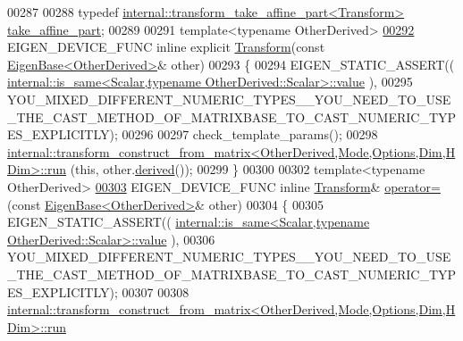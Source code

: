 \begin{DoxyCode}
00287 
00288   \textcolor{keyword}{typedef} \hyperlink{struct_eigen_1_1internal_1_1transform__take__affine__part}{internal::transform\_take\_affine\_part<Transform>} 
      \hyperlink{struct_eigen_1_1internal_1_1transform__take__affine__part}{take\_affine\_part};
00289 
00291   \textcolor{keyword}{template}<\textcolor{keyword}{typename} OtherDerived>
\hyperlink{group___geometry___module_a5ee8b0067f6dadc04684be504e11a0c3}{00292}   EIGEN\_DEVICE\_FUNC \textcolor{keyword}{inline} \textcolor{keyword}{explicit} \hyperlink{group___geometry___module_a5ee8b0067f6dadc04684be504e11a0c3}{Transform}(\textcolor{keyword}{const} 
      \hyperlink{group___core___module_struct_eigen_1_1_eigen_base}{EigenBase<OtherDerived>}& other)
00293   \{
00294     EIGEN\_STATIC\_ASSERT((
      \hyperlink{struct_eigen_1_1internal_1_1is__same}{internal::is\_same<Scalar,typename OtherDerived::Scalar>::value}
      ),
00295       
      YOU\_MIXED\_DIFFERENT\_NUMERIC\_TYPES\_\_YOU\_NEED\_TO\_USE\_THE\_CAST\_METHOD\_OF\_MATRIXBASE\_TO\_CAST\_NUMERIC\_TYPES\_EXPLICITLY);
00296 
00297     check\_template\_params();
00298     
      \hyperlink{struct_eigen_1_1internal_1_1transform__construct__from__matrix}{internal::transform\_construct\_from\_matrix<OtherDerived,Mode,Options,Dim,HDim>::run}
      (\textcolor{keyword}{this}, other.\hyperlink{group___core___module_a324b16961a11d2ecfd2d1b7dd7946545}{derived}());
00299   \}
00300 
00302   \textcolor{keyword}{template}<\textcolor{keyword}{typename} OtherDerived>
\hyperlink{group___geometry___module_ada0d6d0b497e2db223e23fcaa4e8961d}{00303}   EIGEN\_DEVICE\_FUNC \textcolor{keyword}{inline} \hyperlink{group___geometry___module_class_eigen_1_1_transform}{Transform}& \hyperlink{group___geometry___module_ada0d6d0b497e2db223e23fcaa4e8961d}{operator=}(\textcolor{keyword}{const} 
      \hyperlink{group___core___module_struct_eigen_1_1_eigen_base}{EigenBase<OtherDerived>}& other)
00304   \{
00305     EIGEN\_STATIC\_ASSERT((
      \hyperlink{struct_eigen_1_1internal_1_1is__same}{internal::is\_same<Scalar,typename OtherDerived::Scalar>::value}
      ),
00306       
      YOU\_MIXED\_DIFFERENT\_NUMERIC\_TYPES\_\_YOU\_NEED\_TO\_USE\_THE\_CAST\_METHOD\_OF\_MATRIXBASE\_TO\_CAST\_NUMERIC\_TYPES\_EXPLICITLY);
00307 
00308     
      \hyperlink{struct_eigen_1_1internal_1_1transform__construct__from__matrix}{internal::transform\_construct\_from\_matrix<OtherDerived,Mode,Options,Dim,HDim>::run}

\end{DoxyCode}
